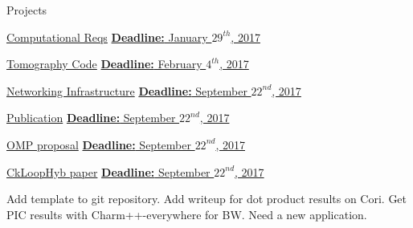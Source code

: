 \begin{columns}  %

\begin{column}{0.10\linewidth}

\begin{block}{Projects}




\underline{Computational Reqs} 
\underline{\textbf{Deadline:} January $29^{th}$, 2017} 
\begin{enumerate}
\pitem 
\pitem 
\end{enumerate} 

\underline{Tomography Code} 
\underline{\textbf{Deadline:} February $4^{th}$, 2017} 
\begin{enumerate}
\pitem 
\pitem 
\end{enumerate} 

\underline{Networking Infrastructure} 
\underline{\textbf{Deadline:} September $22^{nd}$, 2017} 
\begin{enumerate}
\pitem 
\pitem 
\end{enumerate} 

\underline{Publication} 
\underline{\textbf{Deadline:} September $22^{nd}$, 2017} 
\begin{enumerate}
\pitem 
\pitem 
\end{enumerate}


\underline{OMP proposal} 
\underline{\textbf{Deadline:} September $22^{nd}$, 2017} 
\begin{enumerate}
\pitem 
\pitem 
\end{enumerate} 

\underline{CkLoopHyb paper}
\underline{\textbf{Deadline:} September $22^{nd}$, 2017}
\begin{enumerate}
\pitem Add template to git repository.
\pitem Add writeup for dot product results on Cori.
\pitem Get PIC results with Charm++-everywhere for BW.
\pitem Need a new application. 


\end{enumerate}
\end{block}
\end{column}
\end{columns}
